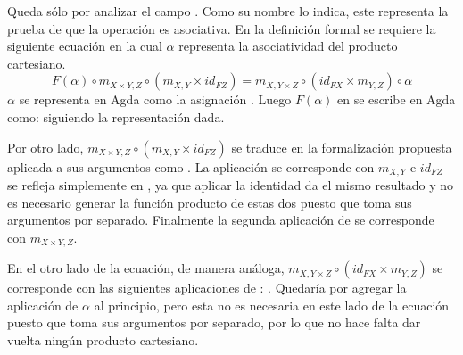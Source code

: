 Queda sólo por analizar el campo . Como su nombre lo indica, este representa la prueba de que la operación  es asociativa. En la definición formal se requiere la siguiente ecuación en la cual $\alpha$ representa la asociatividad del producto cartesiano.
\begin{equation*}
\mathit{F}(\alpha) \circ m_{X \times Y, Z} \circ (m_{X,Y} \times id_{\mathit{F}Z}) = m_{X, Y \times Z} \circ (id_{\mathit{F}X} \times m_{Y,Z}) \circ \alpha
\end{equation*}
$\alpha$ se representa en Agda como la asignación \AgdaSymbol{($\lambda \{$((} \AgdaInductiveConstructor{,} \AgdaSymbol{)} \AgdaInductiveConstructor{,} \AgdaSymbol{) $\rightarrow$ (} \AgdaInductiveConstructor{,} \AgdaSymbol{(} \AgdaInductiveConstructor{,} \AgdaSymbol{))\})}. Luego $\mathit{F}(\alpha)$ en se escribe en Agda como: 
\AgdaSymbol{(} \AgdaSymbol{($\lambda \{$((} \AgdaInductiveConstructor{,} \AgdaSymbol{)} \AgdaInductiveConstructor{,} \AgdaSymbol{) $\rightarrow$ (} \AgdaInductiveConstructor{,} \AgdaSymbol{(} \AgdaInductiveConstructor{,} \AgdaSymbol{))\}))} siguiendo la representación dada.

Por otro lado, $m_{X \times Y, Z} \circ (m_{X,Y} \times id_{\mathit{F}Z})$ se traduce  en la formalización propuesta aplicada a sus argumentos como \AgdaSymbol{(} \AgdaSymbol{(} \AgdaSymbol{)} \AgdaSymbol{))}. La aplicación \AgdaSymbol{(} \AgdaSymbol{)} se corresponde con $m_{X,Y}$ e $id_{\mathit{F}Z}$ se refleja simplemente en , ya que aplicar la identidad da el mismo resultado y no es necesario generar la función producto de estas dos puesto que  toma sus argumentos por separado. Finalmente la segunda aplicación de  se corresponde con $m_{X \times Y, Z}$.

En el otro lado de la ecuación, de manera análoga, $m_{X, Y \times Z} \circ (id_{\mathit{F}X} \times m_{Y,Z})$ se corresponde con las siguientes aplicaciones de : \AgdaSymbol{(}  \AgdaSymbol{(} \AgdaSymbol{))}. Quedaría por agregar la aplicación de $\alpha$ al principio, pero esta no es necesaria en este lado de la ecuación puesto que  toma sus argumentos por separado, por lo que no hace falta dar vuelta ningún producto cartesiano.

